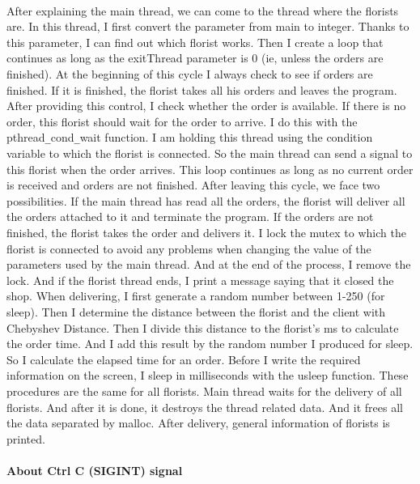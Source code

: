\documentclass{article}
\begin{document}
\paragraph{}

After explaining the main thread, we can come to the thread where the florists
are. In this thread, I first convert the parameter from main to integer. Thanks to
this parameter, I can find out which florist works. Then I create a loop that
continues as long as the exitThread parameter is 0 (ie, unless the orders are
finished). At the beginning of this cycle I always check to see if orders are
finished. If it is finished, the florist takes all his orders and leaves the program. After providing this control, I check whether the order is available. If there is no
order, this florist should wait for the order to arrive. I do this with the
pthread\verb!_!cond\verb!_!wait function. I am holding this thread using the condition
variable to which the florist is connected. So the main thread can send a signal
to this florist when the order arrives. This loop continues as long as no current
order is received and orders are not finished. After leaving this cycle, we face
two possibilities. If the main thread has read all the orders, the florist will
deliver all the orders attached to it and terminate the program. If the orders are
not finished, the florist takes the order and delivers it. I lock the mutex to which
the florist is connected to avoid any problems when changing the value of the
parameters used by the main thread. And at the end of the process, I remove
the lock. And if the florist thread ends, I print a message saying that it closed
the shop. When delivering, I first generate a random number between 1-250
(for sleep). Then I determine the distance between the florist and the client with
Chebyshev Distance. Then I divide this distance to the florist's ms to calculate
the order time. And I add this result by the random number I produced for sleep. So I calculate the elapsed time for an order. Before I write the required
information on the screen, I sleep in milliseconds with the usleep function. These procedures are the same for all florists. Main thread waits for the
delivery of all florists. And after it is done, it destroys the thread related data. And it frees all the data separated by malloc. After delivery, general
information of florists is printed.
\mbox{}\\
\paragraph{About Ctrl C (SIGINT) signal}
\end{document}
